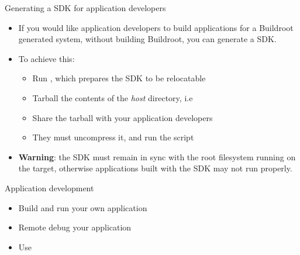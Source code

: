 \begin{frame}{Generating a SDK for application developers}
  \begin{itemize}
  \item If you would like application developers to build applications
    for a Buildroot generated system, without building Buildroot, you
    can generate a SDK.
  \item To achieve this:
    \begin{itemize}
    \item Run , which prepares the SDK to be
      relocatable
    \item Tarball the contents of the {\em host} directory, i.e
    \item Share the tarball with your application developers
    \item They must uncompress it, and run the 
      script
    \end{itemize}
  \item {\bf Warning}: the SDK must remain in sync with the root
    filesystem running on the target, otherwise applications built
    with the SDK may not run properly.
  \end{itemize}
\end{frame}

\setuplabframe
{Application development}
{
  \begin{itemize}
  \item Build and run your own application
  \item Remote debug your application
  \item Use 
  \end{itemize}
}
